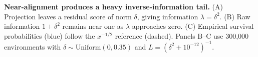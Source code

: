 \textbf{Near-alignment produces a heavy inverse-information tail.}
(A) Projection leaves a residual score of norm $\delta$, giving information $\lambda=\delta^2$. (B) Raw information $1+\delta^2$ remains near one as $\lambda$ approaches zero. (C) Empirical survival probabilities (blue) follow the $x^{-1/2}$ reference (dashed). Panels B--C use 300,000 environments with $\delta\sim\mathrm{Uniform}(0,0.35)$ and $L=(\delta^2+10^{-12})^{-1}$.
